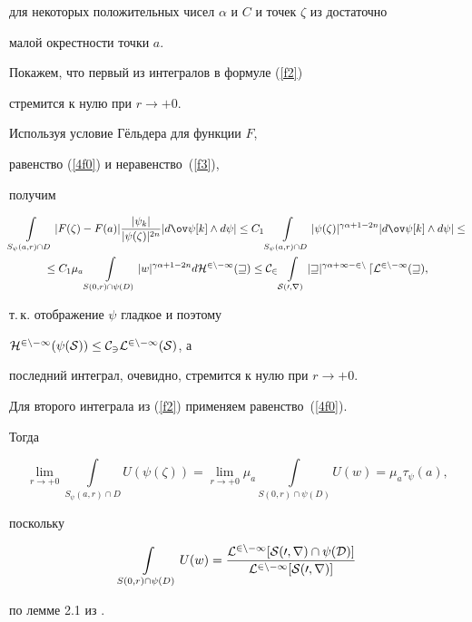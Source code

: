 \begin{pf}
для некоторых положительных чисел $\alpha$ и $C$ и точек $\zeta$ из достаточно


малой окрестности точки $a$.


Покажем, что первый из интегралов в формуле (\ref{f2})


стремится к нулю при $r\to+0$.


Используя условие Г\"ельдера для функции $F$,


равенство (\ref{4f0}) и неравенство~(\ref{f3}),


получим


\begin{multline*}


\int\limits_{S_\psi(a,r)\cap D}|F(\zeta)-F(a)|


\frac{|\psi_k|}{|\psi(\zeta)|^{2n}}|d\ov\psi[k]\land d\psi|\le


C_1\int\limits_{S_\psi(a,r)\cap D}|\psi(\zeta)|^{\gamma\alpha+1-2n}


|d\ov\psi[k]\land d\psi|\le \\


%


\le C_1\mu_a \int\limits_{S(0,r)\cap\psi(D)}|w|^{\gamma\alpha+1-2n}


d\cal H^{2n-1}(w)\le


C_2\int\limits_{S(0,r)}|w|^{\gamma\alpha+1-2n} \, d\cal L^{2n-1}(w),


\end{multline*}


т.\,к. отображение $\psi$ гладкое и поэтому


$\cal H^{2n-1}(\psi(S))\le C_3\cal L^{2n-1}(S)$, а


последний интеграл, очевидно, стремится к нулю при $r\to+0$.


Для второго интеграла из (\ref{f2}) применяем равенство~(\ref{4f0}).


Тогда


$$


\lim_{r\to+0}\int\limits_{S_\psi(a,r)\cap D}U(\psi(\zeta))=


\lim_{r\to+0}\mu_a\int\limits_{S(0,r)\cap \psi(D)}U(w)=


\mu_a\tau_\psi(a),


$$


поскольку


$$


\int\limits_{S(0,r)\cap \psi(D)}U(w)=\frac{\cal L^{2n-1}[S(0,r)\cap


\psi(D)]}{\cal L^{2n-1}[S(0,r)]}


$$


по лемме 2.1 из \cite{Ky}.


\end{pf}





